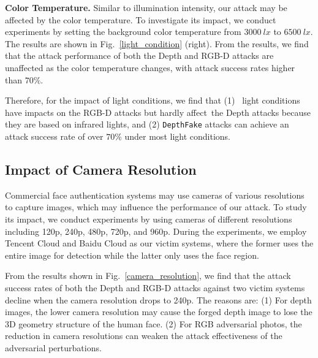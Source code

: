\textbf{Color Temperature.} Similar to illumination intensity, our attack may be affected by the color temperature. To investigate its impact, we conduct experiments by setting the background color temperature from $3000~lx$ to $6500~lx$.
The results are shown in Fig.~\ref{light_condition} (right). From the results, we find that the attack performance of both the Depth and RGB-D  attacks are unaffected as the color temperature changes, with attack success rates higher than $70\%$.

Therefore, for the impact of light conditions, we find that (1)  light conditions have impacts on the RGB-D attacks but hardly affect the Depth attacks because they are based on infrared lights, and (2) \texttt{DepthFake} attacks can achieve an attack success rate of over $70\%$ under most light conditions.

\subsection{Impact of Camera Resolution} 
Commercial face authentication systems may use cameras of various resolutions to capture images, which may influence the performance of our attack. To study its impact, we conduct experiments by using cameras of different resolutions including 120p, 240p, 480p, 720p, and 960p. During the experiments, we employ Tencent Cloud and Baidu Cloud as our victim systems, where the former uses the entire image for detection while the latter only uses the face region. 

From the results shown in Fig.~\ref{camera_resolution},  we find that the attack success rates of both the Depth and RGB-D attacks against two victim systems decline  when the camera resolution drops to 240p. The reasons are: 
(1) For depth images, the lower camera resolution may cause the forged depth image to lose the 3D geometry structure of the human face.
(2) For RGB adversarial photos, the reduction in camera resolutions can weaken the attack effectiveness of the adversarial perturbations. 

